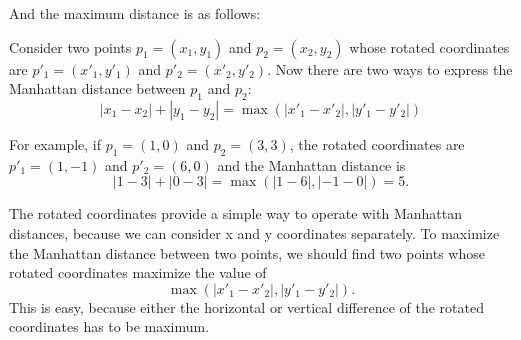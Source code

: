 \begin{center}
\end{center}
And the maximum distance is as follows:
\begin{center}
\end{center}

Consider two points $p_1=(x_1,y_1)$ and $p_2=(x_2,y_2)$ whose rotated
coordinates are $p'_1=(x'_1,y'_1)$ and $p'_2=(x'_2,y'_2)$.
Now there are two ways to express the Manhattan distance
between $p_1$ and $p_2$:
\[|x_1-x_2|+|y_1-y_2| = \max(|x'_1-x'_2|,|y'_1-y'_2|)\]

For example, if $p_1=(1,0)$ and $p_2=(3,3)$,
the rotated coordinates are $p'_1=(1,-1)$ and $p'_2=(6,0)$
and the Manhattan distance is
\[|1-3|+|0-3| = \max(|1-6|,|-1-0|) = 5.\]

The rotated coordinates provide a simple way
to operate with Manhattan distances, because we can
consider x and y coordinates separately.
To maximize the Manhattan distance between two points,
we should find two points whose
rotated coordinates maximize the value of
\[\max(|x'_1-x'_2|,|y'_1-y'_2|).\]
This is easy, because either the horizontal or vertical
difference of the rotated coordinates has to be maximum.
